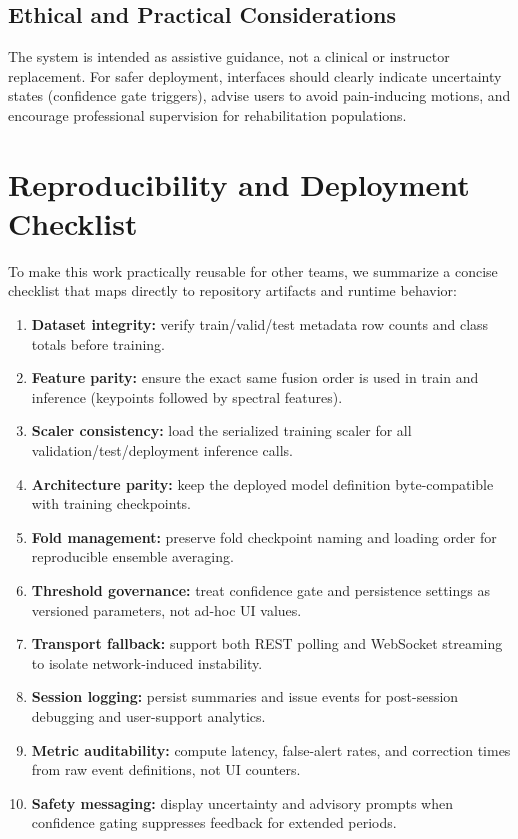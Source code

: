 \documentclass[conference]{IEEEtran}
\begin{document}
\subsection{Ethical and Practical Considerations}
The system is intended as assistive guidance, not a clinical or instructor replacement. For safer deployment, interfaces should clearly indicate uncertainty states (confidence gate triggers), advise users to avoid pain-inducing motions, and encourage professional supervision for rehabilitation populations.

\section{Reproducibility and Deployment Checklist}
To make this work practically reusable for other teams, we summarize a concise checklist that maps directly to repository artifacts and runtime behavior:
\begin{enumerate}
\item \textbf{Dataset integrity:} verify train/valid/test metadata row counts and class totals before training.
\item \textbf{Feature parity:} ensure the exact same fusion order is used in train and inference (keypoints followed by spectral features).
\item \textbf{Scaler consistency:} load the serialized training scaler for all validation/test/deployment inference calls.
\item \textbf{Architecture parity:} keep the deployed model definition byte-compatible with training checkpoints.
\item \textbf{Fold management:} preserve fold checkpoint naming and loading order for reproducible ensemble averaging.
\item \textbf{Threshold governance:} treat confidence gate and persistence settings as versioned parameters, not ad-hoc UI values.
\item \textbf{Transport fallback:} support both REST polling and WebSocket streaming to isolate network-induced instability.
\item \textbf{Session logging:} persist summaries and issue events for post-session debugging and user-support analytics.
\item \textbf{Metric auditability:} compute latency, false-alert rates, and correction times from raw event definitions, not UI counters.
\item \textbf{Safety messaging:} display uncertainty and advisory prompts when confidence gating suppresses feedback for extended periods.
\end{enumerate}
\end{document}
